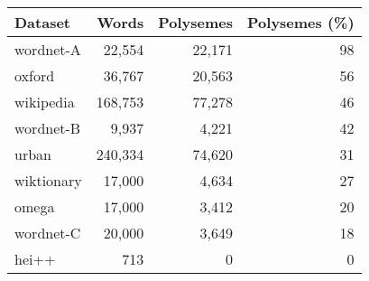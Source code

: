 \begin{tabular}{|l|rrr|}
    \hline
    Dataset    & Words   & Polysemes & Polysemes (\%) \\
    \hline
    wordnet-A  & 22,554  & 22,171    & 98             \\
    oxford     & 36,767  & 20,563    & 56             \\
    wikipedia  & 168,753 & 77,278    & 46             \\
    wordnet-B  & 9,937   & 4,221     & 42             \\
    urban      & 240,334 & 74,620    & 31             \\
    wiktionary & 17,000  & 4,634     & 27             \\
    omega      & 17,000  & 3,412     & 20             \\
    wordnet-C  & 20,000  & 3,649     & 18             \\
    hei++      & 713     & 0         & 0              \\
    \hline
\end{tabular}
